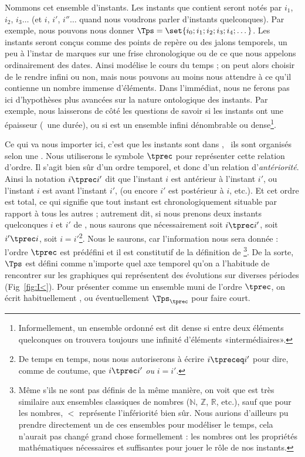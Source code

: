 Nommons {\Tps} cet ensemble d'instants.  
Les instants que
contient {\Tps} seront notés par $i_1$, $i_2$, $i_3 \dotsc$ (et $i$, $i'$, $i''\dotsc$ quand nous voudrons parler d'instants quelconques).
Par exemple, nous pouvons nous donner \(\Tps = \set{i_0; i_1; i_2; i_3; i_4; \dotsc}\).  Les instants seront conçus comme des points de repère ou des jalons temporels, un peu à l'instar de marques sur une frise chronologique ou de ce que nous appelons ordinairement des dates. 
Ainsi {\Tps} modélise le cours du temps ; on peut alors choisir de le rendre infini ou non, mais nous pouvons au moins nous attendre à ce qu'il contienne un nombre immense d'éléments.  
Dans l'immédiat, nous ne ferons pas ici d'hypothèses plus avancées sur la
nature ontologique des instants.  Par exemple, nous laisserons de côté les questions de savoir si les instants ont une épaisseur (\ie\ une durée), ou si {\Tps} est un ensemble infini dénombrable ou dense\footnote{Informellement, un ensemble ordonné est dit dense si entre deux éléments quelconques on trouvera toujours une infinité d'éléments «intermédiaires».}.

Ce qui va nous importer ici,
c'est que les instants sont  dans \Tps, \ie\ ils sont organisés selon une
. %
Nous utiliserons le symbole $\tprec$ pour
représenter cette relation d'ordre.  Il s'agit bien sûr d'un ordre
temporel, et donc d'un relation d'\emph{antériorité}.
Ainsi la notation $i \tprec i'$
dit que l'instant $i$ est antérieur à l'instant $i'$, ou l'instant $i$ est avant l'instant $i'$, (ou encore $i'$ est postérieur à
$i$, etc.).  Et cet ordre est total, ce qui signifie que tout instant est chronologiquement situable par rapport à tous les autres ; autrement dit, si nous prenons deux instants quelconques $i$ et $i'$ de {\Tps}, nous saurons  que 
nécessairement soit $i \tprec i'$, soit $i' \tprec
i$, soit $i=i'$\footnote{De temps en temps, nous nous autoriserons à écrire $i\tpreceq i'$ pour dire, comme de coutume, que $i\tprec i'$ \emph{ou} $i=i'$.}.  %
Nous le saurons, car l'information nous sera donnée : l'ordre $\tprec$ est prédéfini et il est constitutif de la définition de {\Tps}\footnote{Même s'ils ne sont pas définis de la même manière, on voit que {\Tps} est très similaire aux ensembles classiques de nombres ($\mathbb N$, $\mathbb Z$, $\mathbb R$, etc.), sauf que pour les nombres, $<$ représente l'infériorité bien sûr. Nous aurions d'ailleurs pu prendre directement un de ces ensembles pour modéliser le temps, cela n'aurait pas changé grand chose formellement : les nombres ont les propriétés mathématiques nécessaires et suffisantes pour jouer le rôle de nos instants.}.
De la sorte, $\Tps$ est défini comme n'importe quel axe temporel qu'on a l'habitude de rencontrer sur les graphiques qui représentent des évolutions sur diverses périodes (Fig~\ref{fig:I<}).
Pour présenter {\Tps} comme un ensemble muni de l'ordre $\tprec$, on écrit habituellement \tuple{\Tps,\tprec}, ou éventuellement $\Tps_{\tprec}$ pour faire court.

